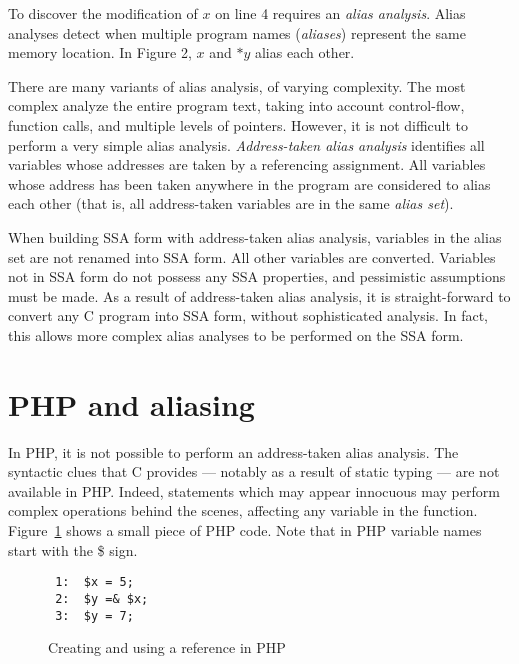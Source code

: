 To discover the modification of $x$ on line 4 requires an \textit{alias
analysis}. Alias analyses detect when multiple
program names (\textit{aliases}) represent the same memory location.  In
Figure 2, $x$ and $*y$ alias each other.

There are many variants of alias analysis, of varying complexity.  The
most complex analyze the entire program text, taking into account
control-flow, function calls, and multiple levels of pointers.
However, it is not difficult to perform a very simple alias analysis.
\textit{Address-taken alias analysis} identifies all variables whose
addresses are taken by a referencing assignment.  All variables whose
address has been taken anywhere in the program are considered to alias
each other (that is, all address-taken variables are in the same
\textit{alias set}).

When building SSA form with address-taken alias analysis, variables in
the alias set are not renamed into SSA form.  All other variables are
converted.  Variables not in SSA form do not possess any SSA
properties, and pessimistic assumptions must be made.  As a result of
address-taken alias analysis, it is straight-forward to convert any C
program into SSA form, without sophisticated analysis.  In fact, this
allows more complex alias analyses to be performed on the SSA form.

\section{PHP and aliasing}


In PHP, it is not possible to perform an address-taken alias
analysis.  The syntactic clues that C provides ---
notably as a result of static typing --- are not available in PHP.
Indeed, statements which may appear innocuous may perform complex
operations behind the scenes, affecting any variable in the function.
Figure~\ref{php-reference} shows a small piece of PHP code. Note that in
PHP variable names start with the \$ sign.

\begin{figure}[thp]
\begin{verbatim}
 1:  $x = 5;
 2:  $y =& $x;
 3:  $y = 7;
\end{verbatim}
\caption{Creating and using a reference in PHP}
\label{php-reference}
\end{figure}


